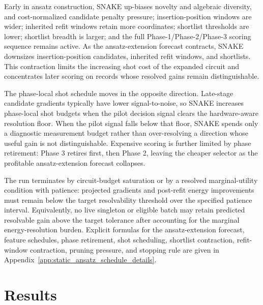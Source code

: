 \documentclass[
  reprint,
  amsmath,
  amssymb,
  aps,
  pra,
  nofootinbib,
  superscriptaddress,
  floatfix
]{revtex4-2}
\begin{document}
Early in ansatz construction, SNAKE up-biases novelty and algebraic diversity, and cost-normalized candidate penalty pressure; insertion-position windows are wider; inherited refit windows retain more coordinates; shortlist thresholds are lower; shortlist breadth is larger; and the full Phase-1/Phase-2/Phase-3 scoring sequence remains active. As the ansatz-extension forecast contracts, SNAKE downsizes insertion-position candidates, inherited refit windows, and shortlists. This contraction limits the increasing shot cost of the expanded circuit and concentrates later scoring on records whose resolved gains remain distinguishable.

The phase-local shot schedule moves in the opposite direction. Late-stage candidate gradients typically have lower signal-to-noise, so SNAKE increases phase-local shot budgets when the pilot decision signal clears the hardware-aware resolution floor. When the pilot signal falls below that floor, SNAKE spends only a diagnostic measurement budget rather than over-resolving a direction whose useful gain is not distinguishable. Expensive scoring is further limited by phase retirement: Phase 3 retires first, then Phase 2, leaving the cheaper selector as the profitable ansatz-extension forecast collapses.

The run terminates by circuit-budget saturation or by a resolved marginal-utility condition with patience: projected gradients and post-refit energy improvements must remain below the target resolvability threshold over the specified patience interval. Equivalently, no live singleton or eligible batch may retain predicted resolvable gain above the target tolerance after accounting for the marginal energy-resolution burden. Explicit formulas for the ansatz-extension forecast, feature schedules, phase retirement, shot scheduling, shortlist contraction, refit-window contraction, pruning pressure, and stopping rule are given in Appendix~\ref{app:static_ansatz_schedule_details}.

\section{Results}
\label{sec:results}
\label{sec:benchmarks}
\end{document}
